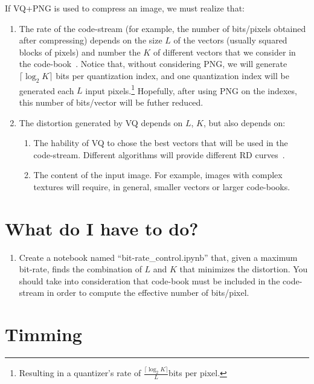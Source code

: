 If VQ+PNG is used to compress an image, we must realize that:
\begin{enumerate}
\item The rate of the code-stream (for example, the number of
  bits/pixels obtained after compressing) depends on the size $L$ of
  the vectors (usually squared blocks of pixels) and number the $K$ of
  different vectors that we consider in the
  code-book~\cite{vruiz__vector_quantization}. Notice that, without
  considering PNG, we will generate $\lceil\log_2 K\rceil$ bits per
  quantization index, and one quantization index will be generated
  each $L$ input pixels.\footnote{Resulting in a quantizer's rate of
  $\frac{\lceil\log_2 K\rceil}{L}$bits per pixel.} Hopefully, after
  using PNG on the indexes, this number of bits/vector will be futher
  reduced.
\item The distortion generated by VQ depends on $L$, $K$, but also
  depends on:
  \begin{enumerate}
  \item The hability of VQ to chose the best vectors that will be used
    in the code-stream. Different algorithms will provide different RD
    curves~\cite{vruiz__information_theory}.
  \item The content of the input image. For example, images with
    complex textures will require, in general, smaller vectors or
    larger code-books.
  \end{enumerate}
\end{enumerate}



\section{What do I have to do?}

\begin{enumerate}
\item Create a notebook named ``bit-rate\_control.ipynb'' that, given
  a maximum bit-rate, finds the combination of $L$ and $K$ that
  minimizes the distortion. You should take into consideration that
  code-book must be included in the code-stream in order to compute
  the effective number of bits/pixel.
\end{enumerate}


\section{Timming}

